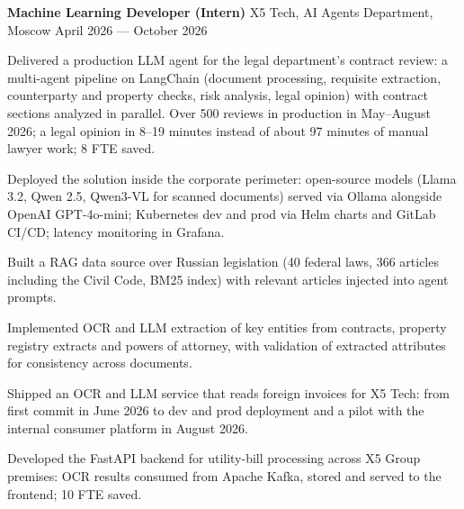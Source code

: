 \documentclass[10pt,a4paper]{article}
\newcommand{\cventry}[3]{%
  \textbf{#1} \textbar{} #3 \textbar{} #2\par\vspace{1pt}}
\begin{document}
\cventry{Machine Learning Developer (Intern)}{April 2026 --- October 2026}{X5 Tech, AI Agents Department, Moscow}
\begin{cvitems}
    \item Delivered a production LLM agent for the legal department's contract review: a multi-agent pipeline on LangChain (document processing, requisite extraction, counterparty and property checks, risk analysis, legal opinion) with contract sections analyzed in parallel. Over 500 reviews in production in May--August 2026; a legal opinion in 8--19 minutes instead of about 97 minutes of manual lawyer work; 8 FTE saved.
    \item Deployed the solution inside the corporate perimeter: open-source models (Llama 3.2, Qwen 2.5, Qwen3-VL for scanned documents) served via Ollama alongside OpenAI GPT-4o-mini; Kubernetes dev and prod via Helm charts and GitLab CI/CD; latency monitoring in Grafana.
    \item Built a RAG data source over Russian legislation (40 federal laws, 366 articles including the Civil Code, BM25 index) with relevant articles injected into agent prompts.
    \item Implemented OCR and LLM extraction of key entities from contracts, property registry extracts and powers of attorney, with validation of extracted attributes for consistency across documents.
    \item Shipped an OCR and LLM service that reads foreign invoices for X5 Tech: from first commit in June 2026 to dev and prod deployment and a pilot with the internal consumer platform in August 2026.
    \item Developed the FastAPI backend for utility-bill processing across X5 Group premises: OCR results consumed from Apache Kafka, stored and served to the frontend; 10 FTE saved.
\end{cvitems}
\end{document}
